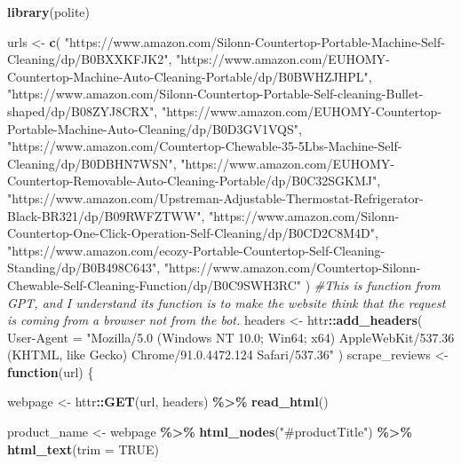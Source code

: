\documentclass[
  11pt,
]{article}
\newenvironment{Shaded}{\begin{snugshade}}{\end{snugshade}}
\newcommand{\AttributeTok}[1]{\textcolor[rgb]{0.13,0.29,0.53}{#1}}
\newcommand{\CommentTok}[1]{\textcolor[rgb]{0.56,0.35,0.01}{\textit{#1}}}
\newcommand{\ConstantTok}[1]{\textcolor[rgb]{0.56,0.35,0.01}{#1}}
\newcommand{\ControlFlowTok}[1]{\textcolor[rgb]{0.13,0.29,0.53}{\textbf{#1}}}
\newcommand{\FunctionTok}[1]{\textcolor[rgb]{0.13,0.29,0.53}{\textbf{#1}}}
\newcommand{\NormalTok}[1]{#1}
\newcommand{\OtherTok}[1]{\textcolor[rgb]{0.56,0.35,0.01}{#1}}
\newcommand{\SpecialCharTok}[1]{\textcolor[rgb]{0.81,0.36,0.00}{\textbf{#1}}}
\newcommand{\StringTok}[1]{\textcolor[rgb]{0.31,0.60,0.02}{#1}}
\begin{document}
\begin{Shaded}
\begin{Highlighting}[]
\FunctionTok{library}\NormalTok{(polite)}

\NormalTok{urls }\OtherTok{\textless{}{-}} \FunctionTok{c}\NormalTok{(}
  \StringTok{"https://www.amazon.com/Silonn{-}Countertop{-}Portable{-}Machine{-}Self{-}Cleaning/dp/B0BXXKFJK2"}\NormalTok{,}
  \StringTok{"https://www.amazon.com/EUHOMY{-}Countertop{-}Machine{-}Auto{-}Cleaning{-}Portable/dp/B0BWHZJHPL"}\NormalTok{,}
  \StringTok{"https://www.amazon.com/Silonn{-}Countertop{-}Portable{-}Self{-}cleaning{-}Bullet{-}shaped/dp/B08ZYJ8CRX"}\NormalTok{,}
  \StringTok{"https://www.amazon.com/EUHOMY{-}Countertop{-}Portable{-}Machine{-}Auto{-}Cleaning/dp/B0D3GV1VQS"}\NormalTok{,}
  \StringTok{"https://www.amazon.com/Countertop{-}Chewable{-}35{-}5Lbs{-}Machine{-}Self{-}Cleaning/dp/B0DBHN7WSN"}\NormalTok{,}
  \StringTok{"https://www.amazon.com/EUHOMY{-}Countertop{-}Removable{-}Auto{-}Cleaning{-}Portable/dp/B0C32SGKMJ"}\NormalTok{,}
  \StringTok{"https://www.amazon.com/Upstreman{-}Adjustable{-}Thermostat{-}Refrigerator{-}Black{-}BR321/dp/B09RWFZTWW"}\NormalTok{,}
  \StringTok{"https://www.amazon.com/Silonn{-}Countertop{-}One{-}Click{-}Operation{-}Self{-}Cleaning/dp/B0CD2C8M4D"}\NormalTok{,}
  \StringTok{"https://www.amazon.com/ecozy{-}Portable{-}Countertop{-}Self{-}Cleaning{-}Standing/dp/B0B498C643"}\NormalTok{,}
  \StringTok{"https://www.amazon.com/Countertop{-}Silonn{-}Chewable{-}Self{-}Cleaning{-}Function/dp/B0C9SWH3RC"}
\NormalTok{)}
\CommentTok{\#This is function from GPT, and I understand its function is to make the website think that the request is coming from a browser not from the bot. }
\NormalTok{headers }\OtherTok{\textless{}{-}}\NormalTok{ httr}\SpecialCharTok{::}\FunctionTok{add\_headers}\NormalTok{(}
  \StringTok{\textasciigrave{}}\AttributeTok{User{-}Agent}\StringTok{\textasciigrave{}} \OtherTok{=} \StringTok{"Mozilla/5.0 (Windows NT 10.0; Win64; x64) AppleWebKit/537.36 (KHTML, like Gecko) Chrome/91.0.4472.124 Safari/537.36"}
\NormalTok{)}
\NormalTok{scrape\_reviews }\OtherTok{\textless{}{-}} \ControlFlowTok{function}\NormalTok{(url) \{}
  
\NormalTok{  webpage }\OtherTok{\textless{}{-}}\NormalTok{ httr}\SpecialCharTok{::}\FunctionTok{GET}\NormalTok{(url, headers) }\SpecialCharTok{\%\textgreater{}\%} \FunctionTok{read\_html}\NormalTok{()}

  
\NormalTok{  product\_name }\OtherTok{\textless{}{-}}\NormalTok{ webpage }\SpecialCharTok{\%\textgreater{}\%}
    \FunctionTok{html\_nodes}\NormalTok{(}\StringTok{"\#productTitle"}\NormalTok{) }\SpecialCharTok{\%\textgreater{}\%}
    \FunctionTok{html\_text}\NormalTok{(}\AttributeTok{trim =} \ConstantTok{TRUE}\NormalTok{)}
  

\end{Highlighting}
\end{Shaded}
\end{document}
